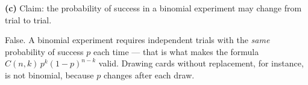 \documentclass[12pt]{ximera}
\begin{document}
\begin{problem}
\begin{prompt}
\textbf{(c)} Claim: the probability of success in a binomial experiment may change
from trial to trial.

\begin{multipleChoice}
\end{multipleChoice}

\begin{feedback}
False. A binomial experiment requires independent trials with the \emph{same}
probability of success $p$ each time --- that is what makes the formula
$C(n,k)\,p^k(1-p)^{n-k}$ valid. Drawing cards without replacement, for instance, is not
binomial, because $p$ changes after each draw.
\end{feedback}
\end{prompt}
\end{problem}
\end{document}

